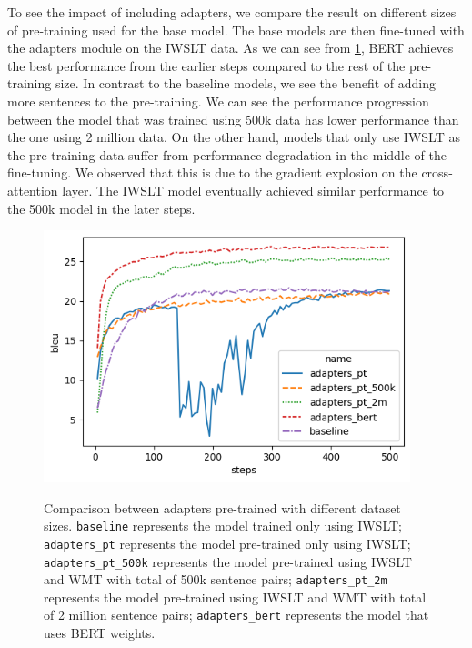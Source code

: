 To see the impact of including adapters, we compare the result on different sizes of pre-training used for the base model. The base models are then fine-tuned with the adapters module on the IWSLT data. As we can see from \cref{img:adpcomp}, BERT achieves the best performance from the earlier steps compared to the rest of the pre-training size. In contrast to the baseline models, we see the benefit of adding more sentences to the pre-training. We can see the performance progression between the model that was trained using 500k data has lower performance than the one using 2 million data. On the other hand, models that only use IWSLT as the pre-training data suffer from performance degradation in the middle of the fine-tuning. We observed that this is due to the gradient explosion on the cross-attention layer. The IWSLT model eventually achieved similar performance to the 500k model in the later steps.
\begin{figure}[h]
    {\includegraphics[width=0.95\textwidth]{img/adapterscomparison.png}}
    \centering
    \caption[Comparison between adapters pre-trained with different dataset sizes.]{
        Comparison between adapters pre-trained with different dataset sizes. \texttt{baseline} represents the model trained only using IWSLT; \texttt{adapters\_pt} represents the model pre-trained only using IWSLT; \texttt{adapters\_pt\_500k} represents the model pre-trained using IWSLT and WMT with total of 500k sentence pairs; \texttt{adapters\_pt\_2m} represents the model pre-trained using IWSLT and WMT with total of 2 million sentence pairs; \texttt{adapters\_bert} represents the model that uses BERT weights.}
    \label{img:adpcomp}
\end{figure}

